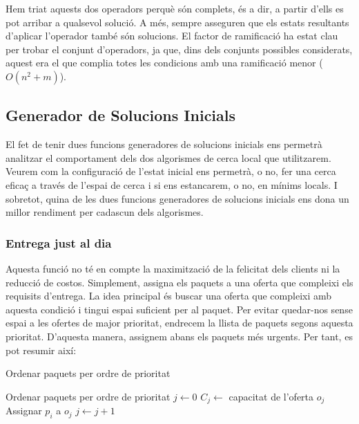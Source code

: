\documentclass[a4paper]{article}
\begin{document}
	Hem triat aquests dos operadors perquè són complets, és a dir, a partir d'ells es pot arribar a qualsevol solució. A més, sempre asseguren que els estats resultants d'aplicar l'operador també són solucions. El factor de ramificació ha estat clau per trobar el conjunt d'operadors, ja que, dins dels conjunts possibles considerats, aquest era el que complia totes les condicions amb una ramificació menor ($O(n^2+m)$).
	
	
	\subsection{Generador de Solucions Inicials}
	
	El fet de tenir dues funcions generadores de solucions inicials ens permetrà analitzar el comportament dels dos algorismes de cerca local que utilitzarem. Veurem com la configuració de l'estat inicial ens permetrà, o no, fer una cerca eficaç a través de l'espai de cerca i si ens estancarem, o no, en mínims locals. I sobretot, quina de les dues funcions generadores de solucions inicials ens dona un millor rendiment per cadascun dels algorismes. \\
	
	\subsubsection{Entrega just al dia}
	
	Aquesta funció no té en compte la maximització de la felicitat dels clients ni la reducció de costos. Simplement, assigna els paquets a una oferta que compleixi els requisits d'entrega. La idea principal és buscar una oferta que compleixi amb aquesta condició i tingui espai suficient per al paquet. Per evitar quedar-nos sense espai a les ofertes de major prioritat, endrecem la llista de paquets segons aquesta prioritat. D'aquesta manera, assignem abans els paquets més urgents. Per tant, es pot resumir així:
	
	\begin{algorithm} [H]
		\caption{Ordenar paquets per ordre de prioritat}
		\begin{algorithmic}[1]
			\State Ordenar paquets per ordre de prioritat
			\State $j \gets 0$
			\State $C_j \gets$ capacitat de l'oferta $o_j$
			\State Assignar $p_i$ a $o_j$
			\Else
			\State $j \gets j + 1$ 
			\EndIf
			\EndWhile
			\EndFor
		\end{algorithmic}
	\end{algorithm}
	
\end{document}
